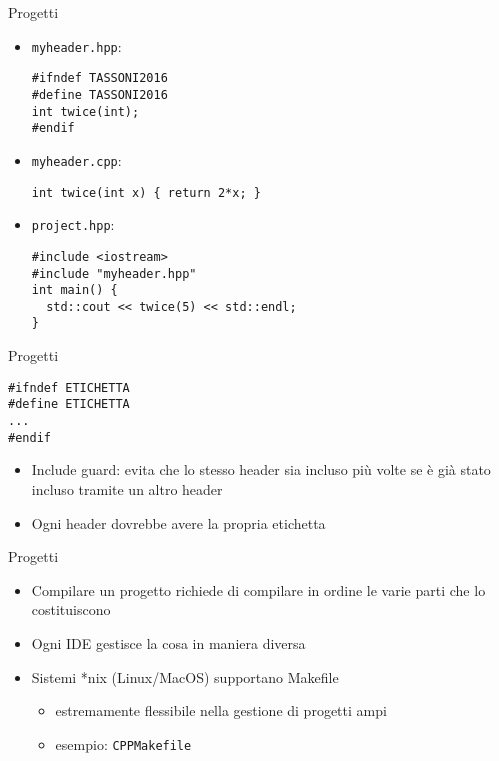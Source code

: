 \begin{frame}[fragile]{Progetti}
  \vfill
  \begin{itemize}
    \item \lstinline$myheader.hpp$:
  \begin{lstlisting}
#ifndef TASSONI2016
#define TASSONI2016
int twice(int);
#endif
  \end{lstlisting}
  \vfill
    \item \lstinline$myheader.cpp$:
  \begin{lstlisting}
int twice(int x) { return 2*x; }
  \end{lstlisting}
  \vfill
    \item \lstinline$project.hpp$:
    \begin{lstlisting}
#include <iostream>
#include "myheader.hpp"
int main() {
  std::cout << twice(5) << std::endl;
}
  \end{lstlisting}
  \end{itemize}
  \vfill
\end{frame}

\begin{frame}[fragile]{Progetti}
  \vfill
  \begin{lstlisting}
#ifndef ETICHETTA
#define ETICHETTA
...
#endif
  \end{lstlisting}
  \vfill
  \begin{itemize}
    \item \alert{Include guard}: evita che lo stesso header sia incluso più volte
    se è già stato incluso tramite un altro header
    \vfill
    \item Ogni header dovrebbe avere la propria etichetta
  \end{itemize}
  \vfill
\end{frame}

\begin{frame}[fragile]{Progetti}
  \vfill
  \begin{itemize}
    \item Compilare un progetto richiede di compilare in ordine le varie parti che
    lo costituiscono
    \vfill
    \item Ogni IDE gestisce la cosa in maniera diversa
    \vfill
    \item Sistemi *nix (Linux/MacOS) supportano \alert{Makefile}
    \begin{itemize}
      \item estremamente flessibile nella gestione di progetti ampi
      \item esempio: \lstinline$CPPMakefile$
    \end{itemize}
  \end{itemize}
  \vfill
\end{frame}

